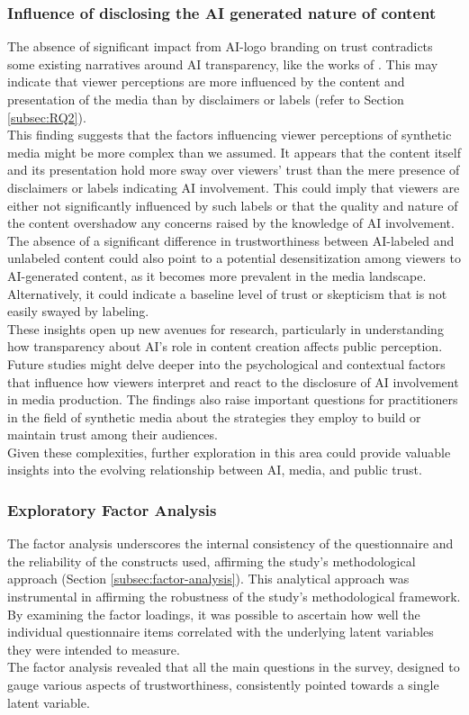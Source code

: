 \documentclass[
  a4paper,  %
  twoside,  %
  bibliography=totoc,
  headsepline,
  cleardoublepage=empty,
  parskip=half,
  draft=false
]{scrbook}
\begin{document}
\subsubsection{Influence of disclosing the AI generated nature of content}
The absence of significant impact from AI-logo branding on trust contradicts some existing narratives around AI transparency, like the works of . This may indicate that viewer perceptions are more influenced by the content and presentation of the media than by disclaimers or labels (refer to Section \ref{subsec:RQ2}). \\
This finding suggests that the factors influencing viewer perceptions of synthetic media might be more complex than we assumed. It appears that the content itself and its presentation hold more sway over viewers' trust than the mere presence of disclaimers or labels indicating AI involvement. This could imply that viewers are either not significantly influenced by such labels or that the quality and nature of the content overshadow any concerns raised by the knowledge of AI involvement. \\
The absence of a significant difference in trustworthiness between AI-labeled and unlabeled content could also point to a potential desensitization among viewers to AI-generated content, as it becomes more prevalent in the media landscape. Alternatively, it could indicate a baseline level of trust or skepticism that is not easily swayed by labeling. \\
These insights open up new avenues for research, particularly in understanding how transparency about AI's role in content creation affects public perception. Future studies might delve deeper into the psychological and contextual factors that influence how viewers interpret and react to the disclosure of AI involvement in media production. The findings also raise important questions for practitioners in the field of synthetic media about the strategies they employ to build or maintain trust among their audiences. \\
Given these complexities, further exploration in this area could provide valuable insights into the evolving relationship between AI, media, and public trust.



\subsubsection{Exploratory Factor Analysis}
The factor analysis underscores the internal consistency of the questionnaire and the reliability of the constructs used, affirming the study's methodological approach (Section \ref{subsec:factor-analysis}). This analytical approach was instrumental in affirming the robustness of the study's methodological framework. By examining the factor loadings, it was possible to ascertain how well the individual questionnaire items correlated with the underlying latent variables they were intended to measure. \\
The factor analysis revealed that all the main questions in the survey, designed to gauge various aspects of trustworthiness, consistently pointed towards a single latent variable.
\end{document}
